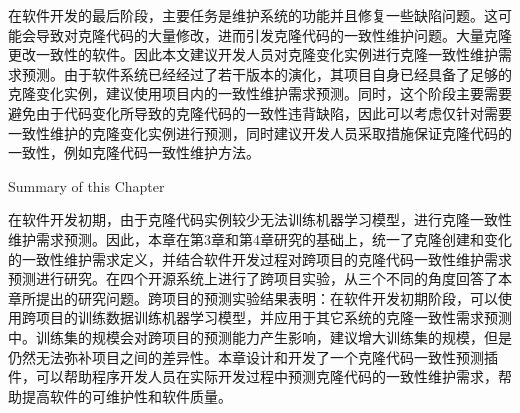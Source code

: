 在软件开发的最后阶段，主要任务是维护系统的功能并且修复一些缺陷问题。这可能会导致对克隆代码的大量修改，进而引发克隆代码的一致性维护问题。大量克隆更改一致性的软件。因此本文建议开发人员对克隆变化实例进行克隆一致性维护需求预测。由于软件系统已经经过了若干版本的演化，其项目自身已经具备了足够的克隆变化实例，建议使用项目内的一致性维护需求预测。同时，这个阶段主要需要避免由于代码变化所导致的克隆代码的一致性违背缺陷，因此可以考虑仅针对需要一致性维护的克隆变化实例进行预测，同时建议开发人员采取措施保证克隆代码的一致性，例如克隆代码一致性维护方法\cite{cheng2016rule,nguyen2012clone}。

{Summary of this Chapter}

在软件开发初期，由于克隆代码实例较少无法训练机器学习模型，进行克隆一致性维护需求预测。因此，本章在第3章和第4章研究的基础上，统一了克隆创建和变化的一致性维护需求定义，并结合软件开发过程对跨项目的克隆代码一致性维护需求预测进行研究。在四个开源系统上进行了跨项目实验，从三个不同的角度回答了本章所提出的研究问题。跨项目的预测实验结果表明：在软件开发初期阶段，可以使用跨项目的训练数据训练机器学习模型，并应用于其它系统的克隆一致性需求预测中。训练集的规模会对跨项目的预测能力产生影响，建议增大训练集的规模，但是仍然无法弥补项目之间的差异性。本章设计和开发了一个克隆代码一致性预测插件，可以帮助程序开发人员在实际开发过程中预测克隆代码的一致性维护需求，帮助提高软件的可维护性和软件质量。